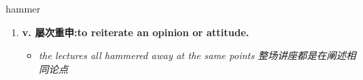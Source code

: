 
\begin{frame}
{\huge hammer}
\begin{center}
\begin{enumerate}\Large
  \item \textbf{v. 屡次重申:to reiterate an opinion or attitude.}
  \begin{itemize}
    \item \em{\Large{the lectures all hammered away at the same points 整场讲座都是在阐述相同论点}}
  \end{itemize}
\end{enumerate}
\end{center}
\end{frame}
